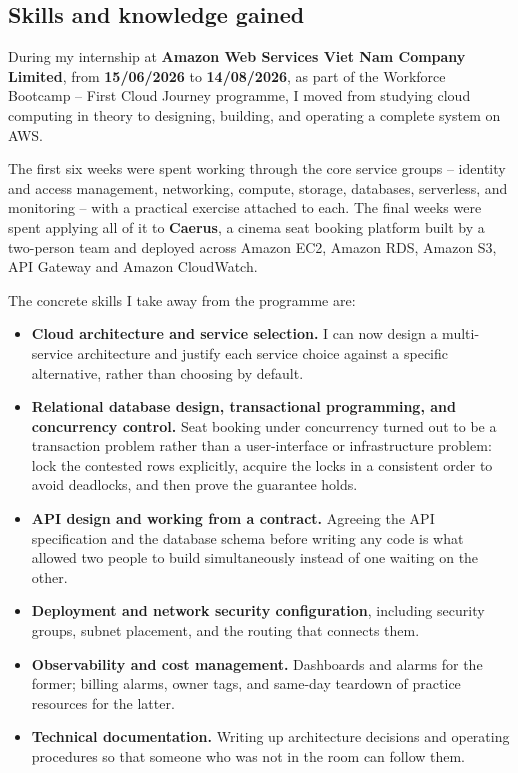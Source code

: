 \subsection{Skills and knowledge gained}

During my internship at \textbf{Amazon Web Services Viet Nam Company Limited},
from \textbf{15/06/2026} to \textbf{14/08/2026}, as part of the Workforce
Bootcamp -- First Cloud Journey programme, I moved from studying cloud computing
in theory to designing, building, and operating a complete system on AWS.

The first six weeks were spent working through the core service groups --
identity and access management, networking, compute, storage, databases,
serverless, and monitoring -- with a practical exercise attached to each. The
final weeks were spent applying all of it to \textbf{Caerus}, a cinema seat
booking platform built by a two-person team and deployed across Amazon EC2,
Amazon RDS, Amazon S3, API Gateway and Amazon CloudWatch.

The concrete skills I take away from the programme are:

\begin{itemize}
    \setlength\itemsep{0.2em}
    \item \textbf{Cloud architecture and service selection.} I can now design a
    multi-service architecture and justify each service choice against a
    specific alternative, rather than choosing by default.

    \item \textbf{Relational database design, transactional programming, and
    concurrency control.} Seat booking under concurrency turned out to be a
    transaction problem rather than a user-interface or infrastructure problem:
    lock the contested rows explicitly, acquire the locks in a consistent order
    to avoid deadlocks, and then prove the guarantee holds.

    \item \textbf{API design and working from a contract.} Agreeing the API
    specification and the database schema before writing any code is what
    allowed two people to build simultaneously instead of one waiting on the
    other.

    \item \textbf{Deployment and network security configuration}, including
    security groups, subnet placement, and the routing that connects them.

    \item \textbf{Observability and cost management.} Dashboards and alarms for
    the former; billing alarms, owner tags, and same-day teardown of practice
    resources for the latter.

    \item \textbf{Technical documentation.} Writing up architecture decisions
    and operating procedures so that someone who was not in the room can follow
    them.
\end{itemize}

